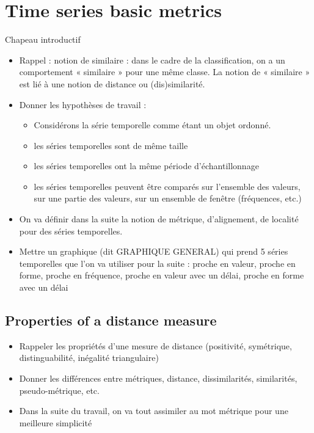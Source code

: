 \chapter{Time series basic metrics}
\label{sec:Chapter_metrics}
\minitoc

\noindent Chapeau introductif
\begin{itemize}
	\item Rappel : notion de similaire : dans le cadre de la classification, on a un comportement « similaire » pour une même classe. La notion de « similaire » est lié à une notion de distance ou (dis)similarité. 
	\item Donner les hypothèses de travail : 
	\begin{itemize}
		\item Considérons la série temporelle comme étant un objet ordonné.
		\item les séries temporelles sont de même taille
		\item les séries temporelles ont la même période d'échantillonnage
		\item les séries temporelles peuvent être comparés sur l'ensemble des valeurs, sur une partie des valeurs, sur un ensemble de fenêtre (fréquences, etc.)
	\end{itemize}
	\item On va définir dans la suite la notion de métrique, d'alignement, de localité pour des séries temporelles.
	\item Mettre un graphique (dit GRAPHIQUE GENERAL) qui prend 5 séries temporelles que l'on va utiliser pour la suite : proche en valeur, proche en forme, proche en fréquence, proche en valeur avec un délai, proche en forme avec un délai
\end{itemize}

\section{Properties of a distance measure}
\begin{itemize}
	\item Rappeler les propriétés d'une mesure de distance (positivité, symétrique, distinguabilité, inégalité triangulaire)
	\item Donner les différences entre métriques, distance, dissimilarités, similarités, pseudo-métrique, etc.
	\item Dans la suite du travail, on va tout assimiler au mot métrique pour une meilleure simplicité
\end{itemize}


